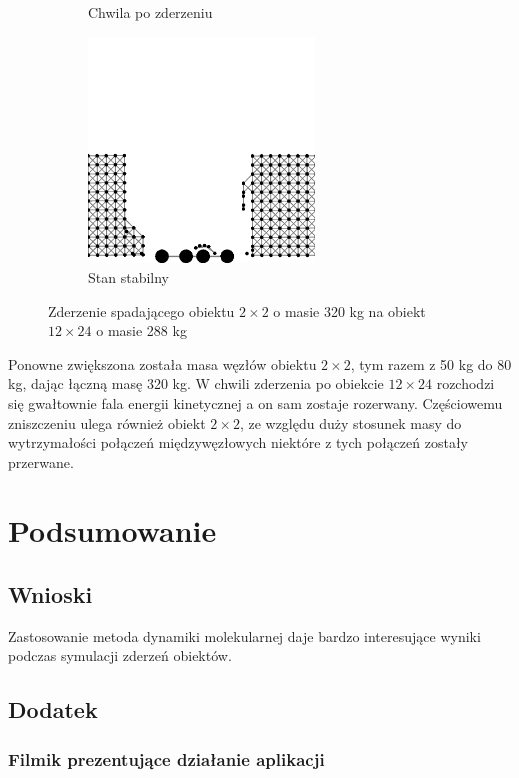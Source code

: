 \documentclass[12pt, letterpaper]{report}
\begin{document}
\begin{figure}[h]
\begin{subfigure}{0.5\textwidth}
            \caption{Chwila po zderzeniu}
        \end{subfigure}
        \begin{subfigure}{0.5\textwidth}
            \centering
            \includegraphics[width=6cm, height=6cm]{collision_2x2_24x12_mass80_4}
            \caption{Stan stabilny}
        \end{subfigure}
        
        \caption{Zderzenie spadającego obiektu $2 \times 2$ o masie 320 kg na obiekt $12 \times 24$ o masie 288 kg}
    \end{figure}

    Ponowne zwiększona została masa węzłów obiektu $2 \times 2$, tym razem z 50 kg do 80 kg, dając łączną masę 320 kg.
    W chwili zderzenia po obiekcie $12 \times 24$ rozchodzi się gwałtownie fala energii kinetycznej a on sam zostaje 
    rozerwany. Częściowemu zniszczeniu ulega również obiekt $2 \times 2$, ze względu duży stosunek masy do wytrzymałości
    połączeń międzywęzłowych niektóre z tych połączeń zostały przerwane.

\chapter{Podsumowanie}
    \section{Wnioski}
    Zastosowanie metoda dynamiki molekularnej daje bardzo interesujące 
    wyniki podczas symulacji zderzeń obiektów.

    \section{Dodatek}

    \subsection{Filmik prezentujące działanie aplikacji}
\end{document}

